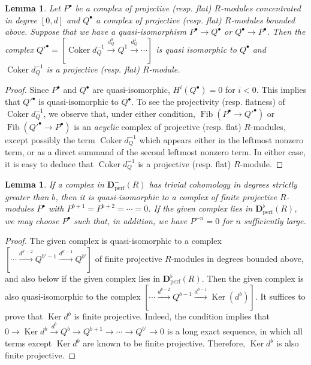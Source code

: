 \documentclass[12pt]{article}
\newtheorem{lemma}[theorem]{Lemma}
\theoremstyle{definition}
\numberwithin{equation}{theorem}
\newcommand{\bbD}{\mathbf{D}}
\newcommand{\perf}{\mathrm{perf}}
\DeclareMathOperator{\Coker}{Coker}
\DeclareMathOperator{\Fib}{Fib}
\DeclareMathOperator{\Ker}{Ker}
\begin{document}
\begin{lemma}\label{L:flat bottom cokernel}
Let $P^\bullet$ be a complex of projective (resp. flat) $R$-modules
concentrated in degree $[0,d]$ and $Q^\bullet$ a complex of projective
(resp. flat) $R$-modules bounded above.  Suppose that we have a
quasi-isomorphism $P^\bullet \to Q^\bullet$ or $Q^\bullet \to
P^\bullet$.  Then the complex $Q'^\bullet = [ \Coker d_Q^{-1}
\xrightarrow{d_Q^0} Q^1 \xrightarrow{d_Q^1} \cdots ]$ is quasi isomorphic
to $Q^\bullet$ and $\Coker d_Q^{-1}$ is a projective (resp. flat)
$R$-module.
\end{lemma}
\begin{proof}
Since $P^\bullet$ and $Q^\bullet$ are quasi-isomorphic,
$H^i(Q^\bullet) = 0$ for $i<0$.  This implies that $Q'^\bullet$ is
quasi-isomorphic to $Q^\bullet$.  To see the projectivity
(resp. flatness) of $\Coker d_Q^{-1}$, we observe that, under either
condition, $\Fib(P^\bullet \to Q'^\bullet)$ or $\Fib(Q'^\bullet \to
P^\bullet)$ is an \emph{acyclic} complex of projective (resp. flat)
$R$-modules, except possibly the term $\Coker d_Q^{-1}$ which appears
either in the leftmost nonzero term, or as a direct summand of the
second leftmost nonzero term.  In either case, it is easy to deduce
that $\Coker d_Q^{-1}$ is a projective (resp. flat) $R$-module.
\end{proof}


\begin{lemma}
\label{L:complex with cohomology capped above}
If a complex in $ \bbD_\perf^-(R)$ has trivial cohomology in degrees strictly greater than $b$, then it is quasi-isomorphic to a complex of finite projective $R$-modules $P^\bullet$ with $P^{b+1} = P^{b+2} = \cdots =0$.  If the given complex lies in $\bbD_\perf^\flat(R)$, we may choose $P^\bullet $ such that, in addition, we have $P^{-n} = 0$ for $n$ sufficiently large.
\end{lemma}
\begin{proof}
The given complex is  quasi-isomorphic to a complex $[\cdots
  \xrightarrow{d^{b'-2}} Q^{b'-1} \xrightarrow{d^{b'-1}} Q^{b'}]$ of
finite projective $R$-modules in degrees bounded above, and also below
if the given complex lies in $\bbD_\perf^\flat(R)$.  Then the given
complex is also quasi-isomorphic to the complex $[\cdots
  \xrightarrow{d^{b-2}} Q^{b-1} \xrightarrow{d^{b-1}} \Ker(d^b)]$.  It
suffices to prove that $\Ker d^b$ is finite projective.  Indeed, the
condition implies that $0 \to \Ker d^b \xrightarrow{d^b} Q^b \to
Q^{b+1} \to \cdots \to Q^{b'} \to0$ is a long exact sequence, in which
all terms except $\Ker d^b$ are known to be finite projective.
Therefore, $\Ker d^b$ is also finite projective.
\end{proof}
\end{document}
